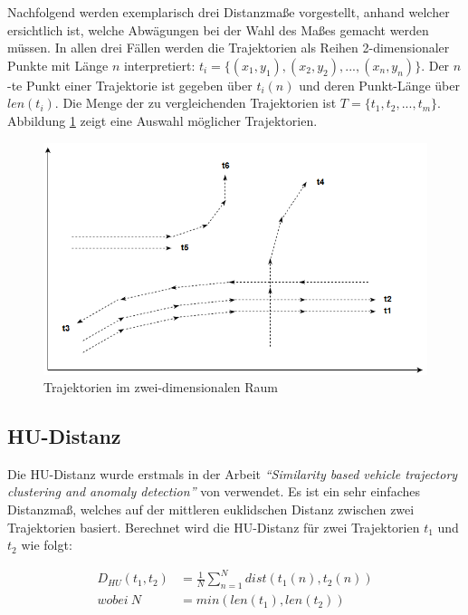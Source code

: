 
Nachfolgend werden exemplarisch drei Distanzmaße vorgestellt, anhand welcher ersichtlich ist, welche Abwägungen
bei der Wahl des Maßes gemacht werden müssen.
In allen drei Fällen werden die Trajektorien als Reihen 2-dimensionaler Punkte mit Länge $n$ interpretiert: $t_i = \{(x_1, y_1), (x_2, y_2), ..., (x_n, y_n)\}$.
Der $n$-te Punkt einer Trajektorie ist gegeben über $t_i(n)$ und deren Punkt-Länge über $len(t_i)$.
Die Menge der zu vergleichenden Trajektorien ist $T = \{t_1, t_2, ..., t_m\}$.
Abbildung \ref{fig:grund_trajectories} zeigt eine Auswahl möglicher Trajektorien.

\begin{figure}[H]
    \centering
    \includegraphics[width=0.6\linewidth]{resources/img/grundlagen/trajectories}
    \caption{Trajektorien im zwei-dimensionalen Raum}
    \label{fig:grund_trajectories}
\end{figure}

\subsection{HU-Distanz}
\label{sec:hu_distance}

Die HU-Distanz wurde erstmals in der Arbeit \textit{``Similarity based vehicle trajectory clustering and anomaly detection''}
von \cite[]{Hu2005} verwendet. Es ist ein sehr einfaches Distanzmaß, welches auf der mittleren euklidschen Distanz
zwischen zwei Trajektorien basiert. Berechnet wird die HU-Distanz für zwei Trajektorien $t_1$ und $t_2$ wie folgt:

\begin{ceqn}
\begin{align}
\label{eq_hu_distance1}
    D_{HU}(t_1, t_2) &= \frac{1}{N} \sum_{n = 1}^N dist(t_1(n), t_2(n)) \\
\label{eq_hu_distance2}
    wobei\ N &= min(len(t_1), len(t_2))
\end{align}
\end{ceqn}

